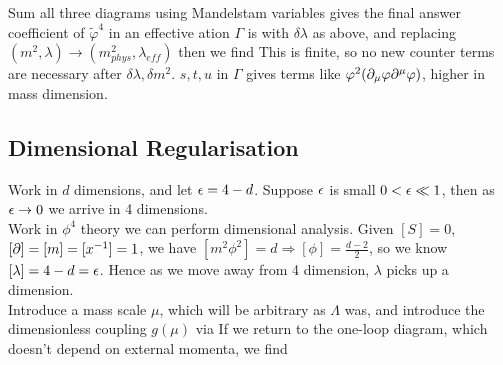 \documentclass{article}
\begin{document}
Sum all three diagrams using Mandelstam variables 
gives the final answer 
coefficient of $\tilde{\varphi}^4$ in an effective ation $\Gamma$ is 
with $\delta \lambda$ as above, and replacing $(m^2, \lambda) \to (m_{phys}^2, \lambda_{eff})$ then we find 
This is finite, so no new counter terms are necessary after $\delta \lambda, \delta m^2$. $s,t,u$ in $\Gamma$ gives terms like $\varphi^2(\partial_\mu \varphi \partial^\mu \varphi)$, higher in mass dimension. 


\subsection{Dimensional Regularisation}
Work in $d$ dimensions, and let $\epsilon=4-d$. Suppose $\epsilon$ is small $0<\epsilon\ll 1$, then as $\epsilon \to 0$ we arrive in 4 dimensions. \\
Work in $\phi^4$ theory 
we can perform dimensional analysis. Given $[S]=0$, $[\partial]= [m] = [x^{-1}] = 1$, we have $[m^2 \phi^2]=d \Rightarrow [\phi] = \frac{d-2}{2}$, so we know $[\lambda] = 4-d = \epsilon$. Hence as we move away from 4 dimension, $\lambda$ picks up a dimension. \\

Introduce a mass scale $\mu$, which will be arbitrary as $\Lambda$ was, and introduce the dimensionless coupling $g(\mu)$ via 
If we return to the one-loop diagram, which doesn't depend on external momenta, we find 
\end{document}
